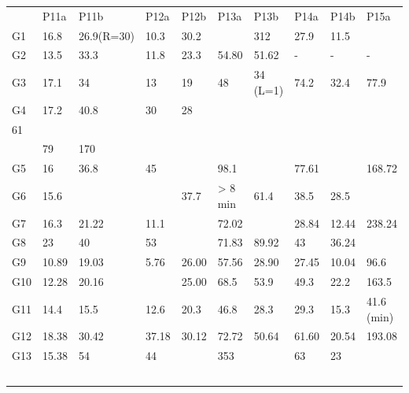 \documentclass[a4paper,12pt]{article}
\begin{document}
\begin{table}
    \begin{tabular}{llllllllll}
    ~   & P11a  & P11b       & P12a  & P12b  & P13a    & P13b     & P14a          & P14b  & P15a        \\
    G1  & 16.8  & 26.9(R=30) & 10.3  & 30.2  & ~       & 312      & 27.9          & 11.5  & ~           \\
    G2  & 13.5  & 33.3       & 11.8  & 23.3  & 54.80   & 51.62    & -             & -     & -           \\
    G3  & 17.1  & 34         & 13    & 19    & 48      & 34 (L=1) & 74.2          & 32.4  & 77.9        \\
    G4  & 17.2  & 40.8       & 30    & 28    & ~       & ~        & \\    61\\    & 79    & 170         \\
    G5  & 16    & 36.8       & 45    & ~     & 98.1    & ~        & 77.61         & ~     & 168.72      \\
    G6  & 15.6  & ~          & ~     & 37.7  & > 8 min & 61.4     & 38.5          & 28.5  & ~           \\
    G7  & 16.3  & 21.22      & 11.1  & ~     & 72.02   & ~        & 28.84         & 12.44 & 238.24      \\
    G8  & 23    & 40         & 53    & ~     & 71.83   & 89.92    & 43            & 36.24 & ~           \\
    G9  & 10.89 & 19.03      & 5.76  & 26.00 & 57.56   & 28.90    & 27.45         & 10.04 & 96.6        \\
    G10 & 12.28 & 20.16      & ~     & 25.00 & 68.5    & 53.9     & 49.3          & 22.2  & 163.5       \\
    G11 & 14.4  & 15.5       & 12.6  & 20.3  & 46.8    & 28.3     & 29.3          & 15.3  & 41.6 (min)  \\
    G12 & 18.38 & 30.42      & 37.18 & 30.12 & 72.72   & 50.64    & 61.60         & 20.54 & 193.08      \\
    G13 & 15.38 & 54         & 44    & ~     & 353     & ~        & 63            & 23    & ~           \\
    ~   & ~     & ~          & ~     & ~     & ~       & ~        & ~             & ~     & ~           \\
    \end{tabular}
\end{table}
\pagebreak
\end{document}
